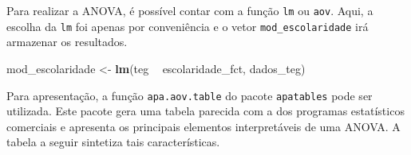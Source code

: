 \documentclass[
]{book}
\newenvironment{Shaded}{\begin{snugshade}}{\end{snugshade}}
\newcommand{\KeywordTok}[1]{\textcolor[rgb]{0.13,0.29,0.53}{\textbf{#1}}}
\newcommand{\NormalTok}[1]{#1}
\newcommand{\OperatorTok}[1]{\textcolor[rgb]{0.81,0.36,0.00}{\textbf{#1}}}
\newcommand{\StringTok}[1]{\textcolor[rgb]{0.31,0.60,0.02}{#1}}
\begin{document}
Para realizar a ANOVA, é possível contar com a função \texttt{lm} ou \texttt{aov}. Aqui, a escolha da \texttt{lm} foi apenas por conveniência e o vetor \texttt{mod\_escolaridade} irá armazenar os resultados.

\begin{Shaded}
\begin{Highlighting}[]
\NormalTok{mod_escolaridade <-}\StringTok{ }\KeywordTok{lm}\NormalTok{(teg }\OperatorTok{~}\StringTok{ }\NormalTok{escolaridade_fct, dados_teg)}
\end{Highlighting}
\end{Shaded}

Para apresentação, a função \texttt{apa.aov.table} do pacote \texttt{apatables} pode ser utilizada. Este pacote gera uma tabela parecida com a dos programas estatísticos comerciais e apresenta os principais elementos interpretáveis de uma ANOVA. A tabela a seguir sintetiza tais características.
\end{document}
